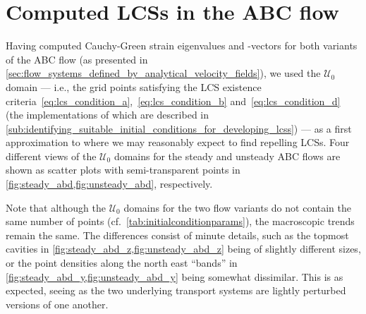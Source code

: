 \section{Computed LCSs in the ABC flow}
\label{sec:computed_lcss_in_the_abc_flow}

Having computed Cauchy-Green strain eigenvalues and -vectors for both
variants of the ABC flow (as presented in
\cref{sec:flow_systems_defined_by_analytical_velocity_fields}), we used
the $\mathcal{U}_{0}$ domain --- i.e., the grid points satisfying the LCS
existence criteria~\eqref{eq:lcs_condition_a},~\eqref{eq:lcs_condition_b}
and~\eqref{eq:lcs_condition_d} (the implementations of which are
described in
\cref{sub:identifying_suitable_initial_conditions_for_developing_lcss}) --- as
a first approximation to where we may reasonably expect to find repelling LCSs.
Four different views of the $\mathcal{U}_{0}$ domains for the steady
and unsteady ABC flows are shown as scatter plots with semi-transparent points
in \cref{fig:steady_abd,fig:unsteady_abd}, respectively.



Note that although the $\mathcal{U}_{0}$ domains for the two
flow variants do not contain the same number of points (cf.\
\cref{tab:initialconditionparams}), the macroscopic trends remain the same. The
differences consist of minute details, such as the topmost cavities in
\cref{fig:steady_abd_z,fig:unsteady_abd_z} being of slightly different sizes,
or the point densities along the north east ``bands'' in
\cref{fig:steady_abd_y,fig:unsteady_abd_y} being somewhat dissimilar. This is
as expected, seeing as the two underlying transport systems are lightly
perturbed versions of one another.


